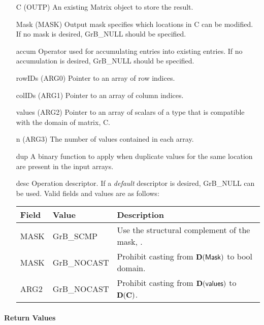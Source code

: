\begin{itemize}[leftmargin=1.1in]
    \item[{\sf C}]      ({\sf OUTP}) An existing Matrix object to store the result.
    \item[{\sf Mask}]   ({\sf MASK}) Output mask specifies which locations in
                        {\sf C} can be modified.  If no mask is desired,
                        {\sf GrB\_NULL} should be specified.
    \item[{\sf accum}]  Operator used for accumulating entries into existing
                         entries. If no accumulation is desired,
                        {\sf GrB\_NULL} should be specified.
    \item[{\sf rowIDs}] ({\sf ARG0}) Pointer to an array of row indices. 
    \item[{\sf colIDs}] ({\sf ARG1}) Pointer to an array of column indices. 
    \item[{\sf values}] ({\sf ARG2}) Pointer to an array of scalars of a type that
                                     is compatible with the domain of matrix, {\sf C}.
    \item[{\sf n}]      ({\sf ARG3}) The number of values contained in each array.
    \item[{\sf dup}]    A binary function to apply when duplicate values for
                        the same location are present in the input arrays.
    \item[{\sf desc}]   Operation descriptor. If a
    \emph{default} descriptor is desired, {\sf GrB\_NULL} can be
    used.  Valid fields and values are as follows: \\
    \begin{tabular}{lll}
    Field  & Value & Description \\
    \hline
    {\sf MASK} & {\sf GrB\_SCMP}   & Use the structural complement of the mask, . \\
    {\sf MASK} & {\sf GrB\_NOCAST} & Prohibit casting from $\bold{D}({\sf Mask})$ to {\sf bool} domain. \\
    {\sf ARG2} & {\sf GrB\_NOCAST} & Prohibit casting from $\bold{D}({\sf values})$ to $\bold{D}({\bf C})$. \\
    \end{tabular}
\end{itemize}

\paragraph{Return Values}

